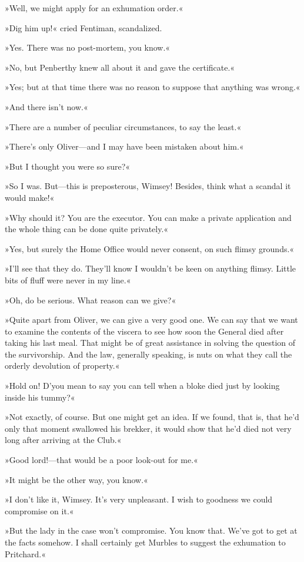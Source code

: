 »Well, we might apply for an exhumation order.«

»Dig him up!« cried Fentiman, scandalized.

»Yes. There was no post-mortem, you know.«

»No, but Penberthy knew all about it and gave the certificate.«

»Yes; but at that time there was no reason to suppose that anything was wrong.«

»And there isn't now.«

»There are a number of peculiar circumstances, to say the least.«

»There's only Oliver—and I may have been mistaken about him.«

»But I thought you were so sure?«

»So I was. But—this is preposterous, Wimsey! Besides, think what a scandal it would make!«

»Why should it? You are the executor. You can make a private application and the whole thing can be done quite privately.«

»Yes, but surely the Home Office would never consent, on such flimsy grounds.«

»I'll see that they do. They'll know I wouldn't be keen on anything flimsy. Little bits of fluff were never in my line.«

»Oh, do be serious. What reason can we give?«

»Quite apart from Oliver, we can give a very good one. We can say that we want to examine the contents of the viscera to see how soon the General died after taking his last meal. That might be of great assistance in solving the question of the survivorship. And the law, generally speaking, is nuts on what they call the orderly devolution of property.«

»Hold on! D'you mean to say you can tell when a bloke died just by looking inside his tummy?«

»Not exactly, of course. But one might get an idea. If we found, that is, that he'd only that moment swallowed his brekker, it would show that he'd died not very long after arriving at the Club.«

»Good lord!—that would be a poor look-out for me.«

»It might be the other way, you know.«

»I don't like it, Wimsey. It's very unpleasant. I wish to goodness we could compromise on it.«

»But the lady in the case won't compromise. You know that. We've got to get at the facts somehow. I shall certainly get Murbles to suggest the exhumation to Pritchard.«

